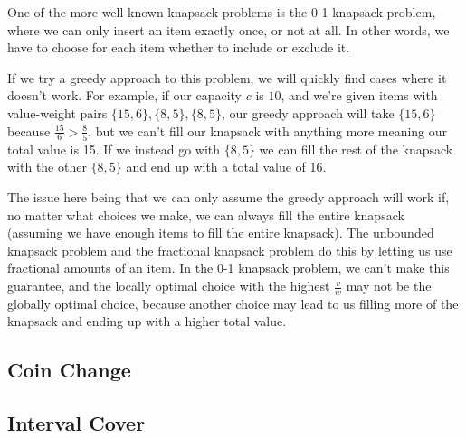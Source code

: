 \hrulefill

One of the more well known knapsack problems is the 0-1 knapsack problem, where we can only insert an item exactly once, or not at all. In other words, we have to choose for each item whether to include or exclude it.

If we try a greedy approach to this problem, we will quickly find cases where it doesn't work. For example, if our capacity $c$ is $10$, and we're given items with value-weight pairs $\{15,6\},\{8,5\},\{8,5\}$, our greedy approach will take $\{15,6\}$ because $\frac{15}{6} > \frac{8}{5}$, but we can't fill our knapsack with anything more meaning our total value is 15. If we instead go with $\{8,5\}$ we can fill the rest of the knapsack with the other $\{8,5\}$ and end up with a total value of 16.

The issue here being that we can only assume the greedy approach will work if, no matter what choices we make, we can always fill the entire knapsack (assuming we have enough items to fill the entire knapsack). The unbounded knapsack problem and the fractional knapsack problem do this by letting us use fractional amounts of an item. In the 0-1 knapsack problem, we can't make this guarantee, and the locally optimal choice with the highest $\frac{v}{w}$ may not be the globally optimal choice, because another choice may lead to us filling more of the knapsack and ending up with a higher total value.

\subsection{Coin Change}

\subsection{Interval Cover}